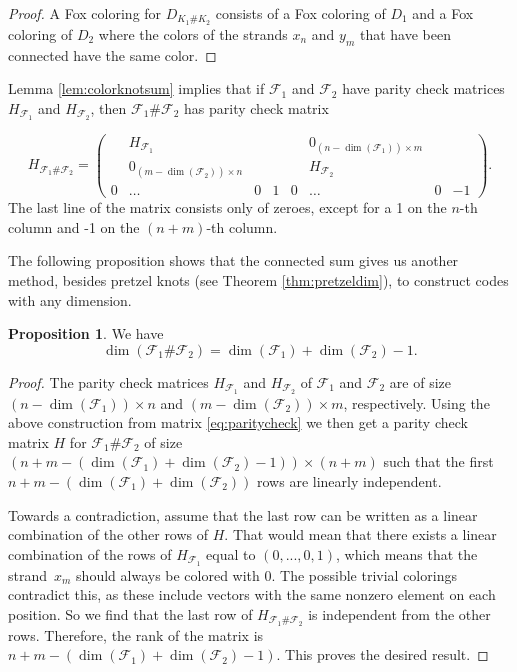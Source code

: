 \documentclass[11pt,a4paper]{article}
\theoremstyle{definition}
\newtheorem{proposition}[theorem]{Proposition}
\newcommand{\mF}{\mathcal{F}}
\begin{document}
\begin{proof}
A Fox coloring for $D_{K_1\#K_2}$ consists of a Fox coloring of $D_1$ and a Fox coloring of $D_2$ where the colors of the strands $x_n$ and $y_m$ that have been connected have the same color.
\end{proof}

Lemma \ref{lem:colorknotsum} implies that if $\mF_1$ and $\mF_2$ have parity check matrices $H_{\mF_1}$ and $H_{\mF_2}$, then $\mF_1\# \mF_2$ has parity check matrix 


\begin{equation}
\label{eq:paritycheck}
  H_{\mF_1 \# \mF_2} = \left(
\begin{array}{cccc|cccc}
& H_{\mF_1} & & & & 0_{(n - \dim(\mF_1)) \times m} &  & \\
& 0_{(m - \dim(\mF_2)) \times n} & & & & H_{\mF_2} & & \\
0 & \dots & 0 & 1 & 0 & \dots & 0 & -1
\end{array} \right).  
\end{equation}
The last line of the matrix consists only of zeroes, except for a 1 on the $n$-th column and -1 on the $(n+m)$-th column.

The following proposition shows that the connected sum gives us another method, besides pretzel knots (see Theorem \ref{thm:pretzeldim}), to construct codes with any dimension.

\begin{proposition}
\label{prop:dimsum}
We have
$$\dim(\mF_1 \# \mF_2) = \dim(\mF_1) + \dim(\mF_2) -1.$$
\end{proposition}
\begin{proof}

The parity check matrices $H_{\mF_1}$ and $H_{\mF_2}$ of $\mF_1$ and $\mF_2$ are of size $(n - \dim(\mF_1)) \times n$ and $(m - \dim(\mF_2)) \times m$, respectively. Using the above construction from matrix \eqref{eq:paritycheck} we then get a parity check matrix $H$ for $\mF_1\# \mF_2$ of size~$(n+m - (\dim(\mF_1) + \dim(\mF_2) - 1)) \times (n + m)$ such that the first $n + m - (\dim(\mF_1) + \dim(\mF_2))$ rows are linearly independent. 

Towards a contradiction, assume that the last row can be written as a linear combination of the other rows of $H$. That would mean that there exists a linear combination of the rows of $H_{\mF_1}$ equal to $(0,...,0,1)$, which means that the strand~$x_m$ should always be colored with 0. The possible trivial colorings contradict this, as these include vectors with the same nonzero element on each position. So we find that the last row of $H_{\mF_1\# \mF_2}$ is independent from the other rows. Therefore, the rank of the matrix is $n + m - (\dim(\mF_1) + \dim(\mF_2) - 1)$. This proves the 
desired result.
\end{proof}
\end{document}
